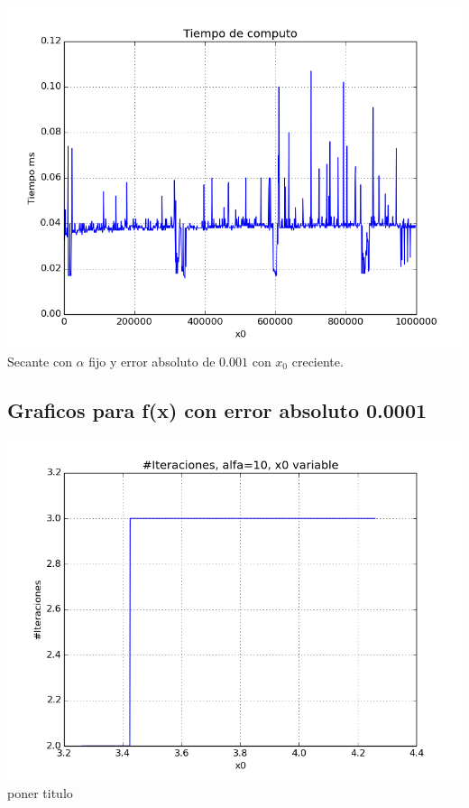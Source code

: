 \begin{center}
\includegraphics[scale=0.5]{graficos/tiempo-f-secante-alfa_fijo-absoluto-0.001-alejando.png}\\
Secante con $\alpha$ fijo y error absoluto de $0.001$ con $x_0$ creciente.
\end{center}

\subsection{Graficos para f(x) con error absoluto 0.0001}

\begin{center}
\includegraphics[scale=0.5]{graficos/iteraciones-f-newton-alfa_fijo-absoluto-0.0001-alejando_cercano.png}\\
poner titulo
\end{center}

